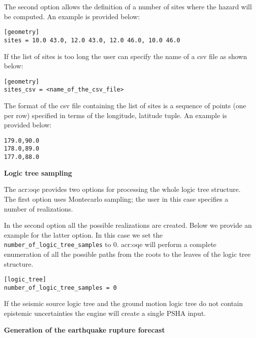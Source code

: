 The second option allows the definition of a number of sites where the hazard
will be computed. An example is provided below:

\begin{verbatim}
[geometry]
sites = 10.0 43.0, 12.0 43.0, 12.0 46.0, 10.0 46.0
\end{verbatim}

If the list of sites is too long the user can specify the name of a csv file
as shown below:

\begin{verbatim}
[geometry]
sites_csv = <name_of_the_csv_file>
\end{verbatim}

The format of the csv file containing the list of sites is a sequence of
points (one per row) specified in terms of the longitude, latitude tuple. An
example is provided below:

\begin{verbatim}
179.0,90.0
178.0,89.0
177.0,88.0
\end{verbatim}

\textbf{Logic tree sampling}

The \gls{acr:oqe} provides two options for processing the whole logic tree
structure. The first option uses Montecarlo sampling; the user in this case
specifies a number of realizations.

In the second option all the possible realizations are created. Below we
provide an example for the latter option. In this case we set the
\texttt{number\-\_of\-\_logic\_tree\_samples} to 0. \gls{acr:oqe} will perform
a complete enumeration of all  the possible paths from the roots to the leaves
of the logic tree  structure.

\begin{verbatim}
[logic_tree]
number_of_logic_tree_samples = 0
\end{verbatim}

If the seismic source logic tree and the ground motion logic tree do not
contain epistemic uncertainties the engine will create a single PSHA input.

\textbf{Generation of the earthquake rupture forecast}

